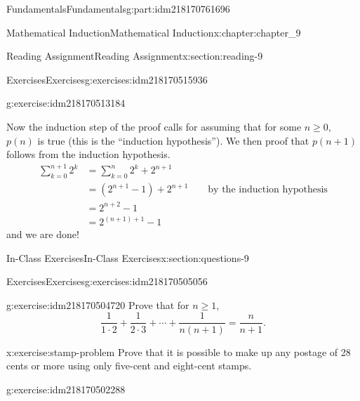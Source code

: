 \documentclass[oneside,10pt,]{book}
\numberwithin{equation}{section}
\begin{document}
\begin{partptx}{Fundamentals}{}{Fundamentals}{}{}{g:part:idm218170761696}
\begin{chapterptx}{Mathematical Induction}{}{Mathematical Induction}{}{}{x:chapter:chapter_9}
\begin{sectionptx}{Reading Assignment}{}{Reading Assignment}{}{}{x:section:reading-9}
\begin{exercises-subsection-numberless}{Exercises}{}{Exercises}{}{}{g:exercises:idm218170515936}
\begin{exercisegroup}
\begin{divisionexerciseeg}{2}{}{}{g:exercise:idm218170513184}
\par
Now the induction step of the proof calls for assuming that for some \(n \geq 0\), \(p(n)\) is true (this is the ``induction hypothesis'').   We then proof that \(p(n+1)\) follows from the induction hypothesis.%
\begin{equation*}
\begin{split}
\sum_{k=0}^{n+1} {2^k} &= \sum_{k=0}^n {2^k} +2^{n+1}\\
&= (2^{n+1}-1) + 2^{n+1} \quad\quad\textrm{by the induction hypothesis}\\
&= 2^{n+2}-1\\ 
&= 2^{(n+1)+1}-1
\end{split}
\end{equation*}
and we are done!%
\end{divisionexerciseeg}%
\end{exercisegroup}
\par\medskip\noindent
\end{exercises-subsection-numberless}
\end{sectionptx}
%
%
\typeout{************************************************}
\typeout{************************************************}
%
\begin{sectionptx}{In-Class Exercises}{}{In-Class Exercises}{}{}{x:section:questions-9}
%
%
%
\typeout{************************************************}
\typeout{************************************************}
%
\begin{exercises-subsection-numberless}{Exercises}{}{Exercises}{}{}{g:exercises:idm218170505056}
\par\medskip\noindent%
%
\begin{exercisegroup}
\begin{divisionexerciseeg}{1}{}{}{g:exercise:idm218170504720}%
Prove that for \(n\geq 1\),%
\begin{equation*}
\frac{1}{1\cdot 2 }+ \frac{1}{2\cdot 3}+ \cdots  + \frac{1}{n(n+1)}= \frac{n}{n+1}.
\end{equation*}
%
\end{divisionexerciseeg}%
\begin{divisionexerciseeg}{2}{}{}{x:exercise:stamp-problem}%
Prove that it is possible to make up any postage of 28 cents or more using only five-cent and eight-cent stamps.%
\end{divisionexerciseeg}%
\begin{divisionexerciseeg}{3}{}{}{g:exercise:idm218170502288}%

\end{divisionexerciseeg}
\end{exercisegroup}
\end{exercises-subsection-numberless}
\end{sectionptx}
\end{chapterptx}
\end{partptx}
\end{document}
